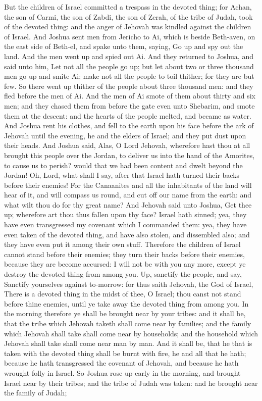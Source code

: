 But the children of Israel committed a trespass in the devoted thing; for Achan, the son of Carmi, the son of Zabdi, the son of Zerah, of the tribe of Judah, took of the devoted thing: and the anger of Jehovah was kindled against the children of Israel.  And Joshua sent men from Jericho to Ai, which is beside Beth-aven, on the east side of Beth-el, and spake unto them, saying, Go up and spy out the land. And the men went up and spied out Ai. And they returned to Joshua, and said unto him, Let not all the people go up; but let about two or three thousand men go up and smite Ai; make not all the people to toil thither; for they are but few. So there went up thither of the people about three thousand men: and they fled before the men of Ai. And the men of Ai smote of them about thirty and six men; and they chased them from before the gate even unto Shebarim, and smote them at the descent: and the hearts of the people melted, and became as water.  And Joshua rent his clothes, and fell to the earth upon his face before the ark of Jehovah until the evening, he and the elders of Israel; and they put dust upon their heads. And Joshua said, Alas, O Lord Jehovah, wherefore hast thou at all brought this people over the Jordan, to deliver us into the hand of the Amorites, to cause us to perish? would that we had been content and dwelt beyond the Jordan! Oh, Lord, what shall I say, after that Israel hath turned their backs before their enemies! For the Canaanites and all the inhabitants of the land will hear of it, and will compass us round, and cut off our name from the earth: and what wilt thou do for thy great name?  And Jehovah said unto Joshua, Get thee up; wherefore art thou thus fallen upon thy face? Israel hath sinned; yea, they have even transgressed my covenant which I commanded them: yea, they have even taken of the devoted thing, and have also stolen, and dissembled also; and they have even put it among their own stuff. Therefore the children of Israel cannot stand before their enemies; they turn their backs before their enemies, because they are become accursed: I will not be with you any more, except ye destroy the devoted thing from among you. Up, sanctify the people, and say, Sanctify yourselves against to-morrow: for thus saith Jehovah, the God of Israel, There is a devoted thing in the midst of thee, O Israel; thou canst not stand before thine enemies, until ye take away the devoted thing from among you. In the morning therefore ye shall be brought near by your tribes: and it shall be, that the tribe which Jehovah taketh shall come near by families; and the family which Jehovah shall take shall come near by households; and the household which Jehovah shall take shall come near man by man. And it shall be, that he that is taken with the devoted thing shall be burnt with fire, he and all that he hath; because he hath transgressed the covenant of Jehovah, and because he hath wrought folly in Israel.  So Joshua rose up early in the morning, and brought Israel near by their tribes; and the tribe of Judah was taken: and he brought near the family of Judah; 